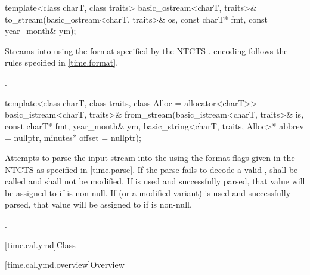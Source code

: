 %
\begin{itemdecl}
template<class charT, class traits>
  basic_ostream<charT, traits>&
    to_stream(basic_ostream<charT, traits>& os, const charT* fmt, const year_month& ym);
\end{itemdecl}

\begin{itemdescr}
\pnum
\effects
Streams  into  using
the format specified by the NTCTS .
 encoding follows the rules specified in \ref{time.format}.

\pnum
\returns {}.
\end{itemdescr}

%
\begin{itemdecl}
template<class charT, class traits, class Alloc = allocator<charT>>
  basic_istream<charT, traits>&
    from_stream(basic_istream<charT, traits>& is, const charT* fmt,
                year_month& ym, basic_string<charT, traits, Alloc>* abbrev = nullptr,
                minutes* offset = nullptr);
\end{itemdecl}

\begin{itemdescr}
\pnum
\effects
Attempts to parse the input stream 
into the   using
the format flags given in the NTCTS 
as specified in \ref{time.parse}.
If the parse fails to decode a valid ,
 shall be called
and  shall not be modified.
If  is used and successfully parsed,
that value will be assigned to  if  is non-null.
If  (or a modified variant) is used and successfully parsed,
that value will be assigned to  if  is non-null.

\pnum
\returns {}.
\end{itemdescr}

[time.cal.ymd]{Class }

[time.cal.ymd.overview]{Overview}

